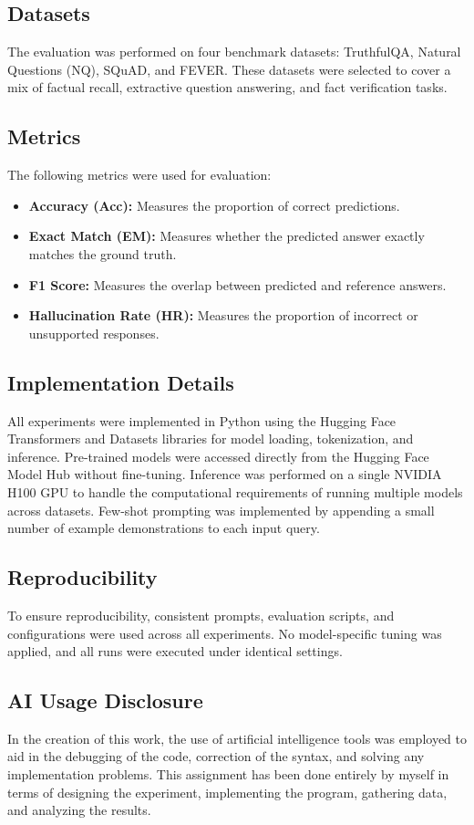 \documentclass[sigconf,nonacm]{acmart}
\begin{document}
\subsection{Datasets}

The evaluation was performed on four benchmark datasets: TruthfulQA, Natural Questions (NQ), SQuAD, and FEVER. These datasets were selected to cover a mix of factual recall, extractive question answering, and fact verification tasks.

\subsection{Metrics}

The following metrics were used for evaluation:
\begin{itemize}
    \item \textbf{Accuracy (Acc):} Measures the proportion of correct predictions.
    \item \textbf{Exact Match (EM):} Measures whether the predicted answer exactly matches the ground truth.
    \item \textbf{F1 Score:} Measures the overlap between predicted and reference answers.
    \item \textbf{Hallucination Rate (HR):} Measures the proportion of incorrect or unsupported responses.
\end{itemize}

\subsection{Implementation Details}

All experiments were implemented in Python using the Hugging Face Transformers and Datasets libraries for model loading, tokenization, and inference. Pre-trained models were accessed directly from the Hugging Face Model Hub without fine-tuning. Inference was performed on a single NVIDIA H100 GPU to handle the computational requirements of running multiple models across datasets. Few-shot prompting was implemented by appending a small number of example demonstrations to each input query.

\subsection{Reproducibility}

To ensure reproducibility, consistent prompts, evaluation scripts, and configurations were used across all experiments. No model-specific tuning was applied, and all runs were executed under identical settings.


\subsection{AI Usage Disclosure}

In the creation of this work, the use of artificial intelligence tools was employed to aid in the debugging of the code, correction of the syntax, and solving any implementation problems. This assignment has been done entirely by myself in terms of designing the experiment, implementing the program, gathering data, and analyzing the results.
\end{document}
